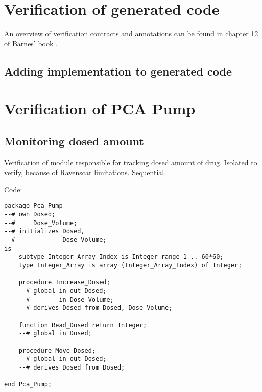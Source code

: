 \section{Verification of generated code}
\label{verification:generated}

An overview of verification contracts and annotations can be found in chapter 12 of Barnes' book \cite{Barnes:Book}.


\subsection{Adding implementation to generated code}
\label{verification:generated:implementation}


\section{Verification of PCA Pump}
\label{verification:pcapump}


\subsection{Monitoring dosed amount}
\label{verification:pcapump:monitoring}

Verification of module responsible for tracking dosed amount of drug.
Isolated to verify, because of Ravenscar limitations.
Sequential.

Code:

\begin{lstlisting}
package Pca_Pump
--# own Dosed;
--#     Dose_Volume;
--# initializes Dosed,
--#             Dose_Volume;
is
    subtype Integer_Array_Index is Integer range 1 .. 60*60;
    type Integer_Array is array (Integer_Array_Index) of Integer;

    procedure Increase_Dosed;
    --# global in out Dosed;
    --#        in Dose_Volume;
    --# derives Dosed from Dosed, Dose_Volume;

    function Read_Dosed return Integer;
    --# global in Dosed;

    procedure Move_Dosed;
    --# global in out Dosed;
    --# derives Dosed from Dosed;

end Pca_Pump;
\end{lstlisting}


